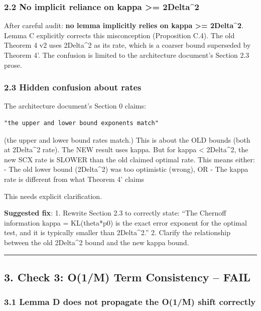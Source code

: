\documentclass[
  12pt,
]{article}
\begin{document}
\subsubsection{2.2 No implicit reliance on kappa \textgreater=
2Delta\^{}2}\label{no-implicit-reliance-on-kappa-2delta2}

After careful audit: \textbf{no lemma implicitly relies on kappa
\textgreater= 2Delta\^{}2}. Lemma C explicitly corrects this
misconception (Proposition C.4). The old Theorem 4 v2 uses 2Delta\^{}2
as its rate, which is a coarser bound superseded by Theorem 4'. The
confusion is limited to the architecture document's Section 2.3 prose.

\subsubsection{2.3 Hidden confusion about
rates}\label{hidden-confusion-about-rates}

The architecture document's Section 0 claims:

\begin{verbatim}
"the upper and lower bound exponents match"
\end{verbatim}

(the upper and lower bound rates match.) This is about the OLD bounds
(both at 2Delta\^{}2 rate). The NEW result uses kappa. But for kappa
\textless{} 2Delta\^{}2, the new SCX rate is SLOWER than the old claimed
optimal rate. This means either: - The old lower bound (2Delta\^{}2) was
too optimistic (wrong), OR - The kappa rate is different from what
Theorem 4' claims

This needs explicit clarification.

\textbf{Suggested fix}: 1. Rewrite Section 2.3 to correctly state: ``The
Chernoff information kappa = KL(theta*\textbar\textbar p0) is the exact
error exponent for the optimal test, and it is typically smaller than
2Delta\^{}2.'' 2. Clarify the relationship between the old 2Delta\^{}2
bound and the new kappa bound.

\begin{center}\rule{0.5\linewidth}{0.5pt}\end{center}

\subsection{3. Check 3: O(1/M) Term Consistency --
FAIL}\label{check-3-o1m-term-consistency-fail}

\subsubsection{3.1 Lemma D does not propagate the O(1/M) shift
correctly}\label{lemma-d-does-not-propagate-the-o1m-shift-correctly}
\end{document}
